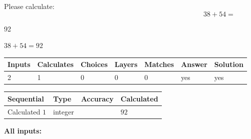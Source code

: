 \documentclass[12pt]{article}
\begin{document}
Please calculate:
\begin{equation}
38 +  %
54 = \nonumber
\end{equation}
 
 
 
\noindent{}
 
 

92
 
 
\noindent{}
 
 

 
 
 
\noindent{}
 
 

$ %
38 +  %
54=   %
92$
 
 
\noindent{}
 
 

 
   
   
   
   
\noindent\begin{tabular}{|l|l|l|l|l|l|l|}
 \hline
Inputs & Calculates & Choices & Layers & Matches & Answer & Solution \\ \hline
 2  & 
 1  & 
 0
  & 
 0  & 
 0  & 
  yes & 
  yes 
  \\ \hline
 \end{tabular}
   
   
   
   
\noindent{}
   
   
  
  
\noindent\begin{tabular}{|l|l|l|l|}
\hline
 Sequential & Type & Accuracy & Calculated \\ 
\hline
 
 
  Calculated $  1 $ & integer &  & 
  $ 92 $ 
 \\  \hline  
 \end{tabular}
   
   
   
   
\noindent\vspace{0.1in}\hspace{-0.08in} {\textbf{\Large{All inputs: }}}
   
   
  
\end{document}
